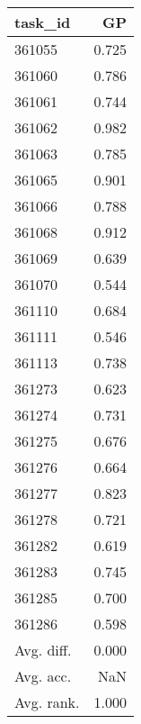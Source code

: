 \begin{tabular}{lr}
\toprule
task\_id & GP \\
\midrule
361055 & 0.725 \\
361060 & 0.786 \\
361061 & 0.744 \\
361062 & 0.982 \\
361063 & 0.785 \\
361065 & 0.901 \\
361066 & 0.788 \\
361068 & 0.912 \\
361069 & 0.639 \\
361070 & 0.544 \\
361110 & 0.684 \\
361111 & 0.546 \\
361113 & 0.738 \\
361273 & 0.623 \\
361274 & 0.731 \\
361275 & 0.676 \\
361276 & 0.664 \\
361277 & 0.823 \\
361278 & 0.721 \\
361282 & 0.619 \\
361283 & 0.745 \\
361285 & 0.700 \\
361286 & 0.598 \\
Avg. diff. & 0.000 \\
Avg. acc. & NaN \\
Avg. rank. & 1.000 \\
\bottomrule
\end{tabular}
